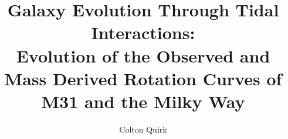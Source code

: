 \documentclass[twocolumn,linenumbers,trackchanges]{aastex7}
\begin{document}
\title{Galaxy Evolution Through Tidal Interactions:\\Evolution of the Observed and Mass Derived Rotation Curves of M31 and the Milky Way}

\author{Colton Quirk}


\end{document}
